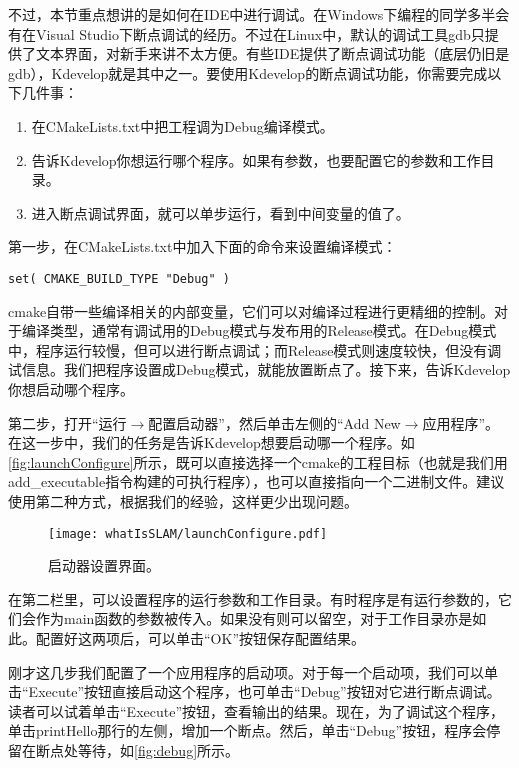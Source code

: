 不过，本节重点想讲的是如何在IDE中进行调试。在Windows下编程的同学多半会有在Visual Studio下断点调试的经历。不过在Linux中，默认的调试工具gdb只提供了文本界面，对新手来讲不太方便。有些IDE提供了断点调试功能（底层仍旧是gdb），Kdevelop就是其中之一。要使用Kdevelop的断点调试功能，你需要完成以下几件事：

\begin{enumerate}
	\item 在CMakeLists.txt中把工程调为Debug编译模式。
	\item 告诉Kdevelop你想运行哪个程序。如果有参数，也要配置它的参数和工作目录。
	\item 进入断点调试界面，就可以单步运行，看到中间变量的值了。
\end{enumerate}

\clearpage

第一步，在CMakeLists.txt中加入下面的命令来设置编译模式：
\begin{lstlisting}
set( CMAKE_BUILD_TYPE "Debug" )
\end{lstlisting}

cmake自带一些编译相关的内部变量，它们可以对编译过程进行更精细的控制。对于编译类型，通常有调试用的Debug模式与发布用的Release模式。在Debug模式中，程序运行较慢，但可以进行断点调试；而Release模式则速度较快，但没有调试信息。我们把程序设置成Debug模式，就能放置断点了。接下来，告诉Kdevelop你想启动哪个程序。

第二步，打开“运行$\rightarrow$配置启动器”，然后单击左侧的“Add New$\rightarrow$应用程序”。在这一步中，我们的任务是告诉Kdevelop想要启动哪一个程序。如\autoref{fig:launchConfigure}所示，既可以直接选择一个cmake的工程目标（也就是我们用add_executable指令构建的可执行程序），也可以直接指向一个二进制文件。建议使用第二种方式，根据我们的经验，这样更少出现问题。

\begin{figure}[!ht]
	\centering
	\texttt{[image: whatIsSLAM/launchConfigure.pdf]}
	\caption{启动器设置界面。}
	\label{fig:launchConfigure}
\end{figure}

在第二栏里，可以设置程序的运行参数和工作目录。有时程序是有运行参数的，它们会作为main函数的参数被传入。如果没有则可以留空，对于工作目录亦是如此。配置好这两项后，可以单击“OK”按钮保存配置结果。

刚才这几步我们配置了一个应用程序的启动项。对于每一个启动项，我们可以单击“Execute”按钮直接启动这个程序，也可单击“Debug”按钮对它进行断点调试。读者可以试着单击“Execute”按钮，查看输出的结果。现在，为了调试这个程序，单击printHello那行的左侧，增加一个断点。然后，单击“Debug”按钮，程序会停留在断点处等待，如\autoref{fig:debug}所示。

